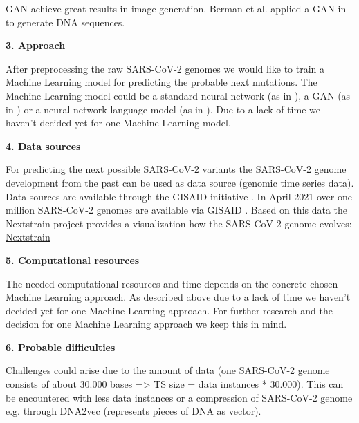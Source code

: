 \ac{GAN} achieve great results in image generation. Berman et al. applied a \ac{GAN} in \cite{berman2020mutagan} to generate \ac{DNA} sequences.


\textbf{3. Approach}

After preprocessing the raw SARS-CoV-2 genomes we would like to train a Machine Learning model for predicting the probable next mutations. The Machine Learning model could be a standard neural network (as in  \cite{salamaPredictionVirusMutation2016}), a GAN (as in \cite{berman2020mutagan}) or a neural network language model (as in \cite{Hie284}). Due to a lack of time we haven't decided yet for one Machine Learning model.

\textbf{4. Data sources}

For predicting the next possible SARS-CoV-2 variants the SARS-CoV-2 genome development from the past can be used as data source (genomic time series data). Data sources are available through the GISAID initiative \cite{gisaideditorGISAIDMission}. In April 2021 over one million SARS-CoV-2 genomes are available via GISAID \cite{maxmenOneMillionCoronavirus2021}. Based on this data the Nextstrain project provides a visualization how the SARS-CoV-2 genome evolves: \href{https://nextstrain.org/ncov/global?label=clade:19A}{Nextstrain}



\textbf{5. Computational resources}

The needed computational resources and time depends on the concrete chosen Machine Learning approach. As described above due to a lack of time we haven't decided yet for one Machine Learning approach. For further research and the decision for one Machine Learning approach we keep this in mind.


\textbf{6. Probable difficulties}

Challenges could arise due to the amount of data (one SARS-CoV-2 genome consists of about 30.000 bases => TS size = data instances * 30.000). This can be encountered with less data instances or a compression of SARS-CoV-2 genome e.g. through DNA2vec \cite{ng2017dna2vec} (represents pieces of \ac{DNA} as vector).

\newpage
